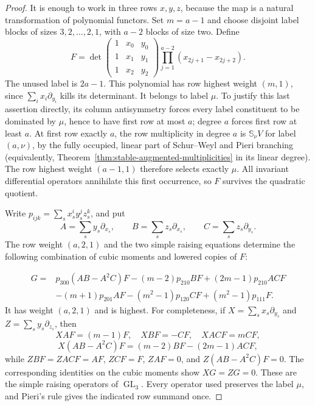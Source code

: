 \begin{proof}
It is enough to work in three rows $x,y,z$, because the map is a
natural transformation of polynomial functors. Set $m=a-1$ and
choose disjoint label blocks of sizes $3,2,\ldots,2,1$, with $a-2$
blocks of size two. Define
\[
 F=\det\begin{pmatrix}1&x_0&y_0\\1&x_1&y_1\\1&x_2&y_2\end{pmatrix}
       \prod_{j=1}^{a-2}(x_{2j+1}-x_{2j+2}).
\]
The unused label is $2a-1$. This polynomial has row highest weight
$(m,1)$, since $\sum_i x_i\partial_{y_i}$ kills its determinant.
It belongs to label $\mu$. To justify this last assertion directly,
its column antisymmetry forces every label constituent to be
 dominated by $\mu$, hence to have first row at most $a$; degree $a$
forces first row at least $a$. At first row exactly $a$, the
row multiplicity in degree $a$ is $\mathbb S_\nu V$ for label
$(a,\nu)$, by the fully occupied, linear part of Schur--Weyl and
Pieri branching (equivalently, Theorem~\ref{thm:stable-augmented-multiplicities}
in its linear degree). The row highest weight $(a-1,1)$ therefore selects
exactly $\mu$. All invariant differential operators annihilate this
first occurrence, so $F$ survives the quadratic quotient.

Write $p_{ijk}=\sum_s x_s^iy_s^jz_s^k$, and put
\[
 A=\sum_s y_s\partial_{x_s},\qquad
 B=\sum_s z_s\partial_{x_s},\qquad
 C=\sum_s z_s\partial_{y_s}.
\]
The row weight $(a,2,1)$ and the two simple raising equations
determine the following combination of cubic moments and lowered
copies of $F$:

\begin{align*}
 G={}&p_{300}(AB-A^2C)F-(m-2)p_{210}BF
 +(2m-1)p_{210}ACF\\
 &-(m+1)p_{201}AF-(m^2-1)p_{120}CF
 +(m^2-1)p_{111}F.
\end{align*}
It has weight $(a,2,1)$ and is highest. For completeness, if
$X=\sum_sx_s\partial_{y_s}$ and
$Z=\sum_sy_s\partial_{z_s}$, then
\[
 XAF=(m-1)F,\quad XBF=-CF,\quad XACF=mCF,
\]
\[
 X(AB-A^2C)F=(m-2)BF-(2m-1)ACF,
\]
while $ZBF=ZACF=AF$, $ZCF=F$, $ZAF=0$, and
$Z(AB-A^2C)F=0$. The corresponding identities on the cubic moments
show $XG=ZG=0$. These are the simple raising operators of
$\operatorname{GL}_3$. Every operator used preserves the label
$\mu$, and Pieri's rule gives the indicated row summand once.


\end{proof}
